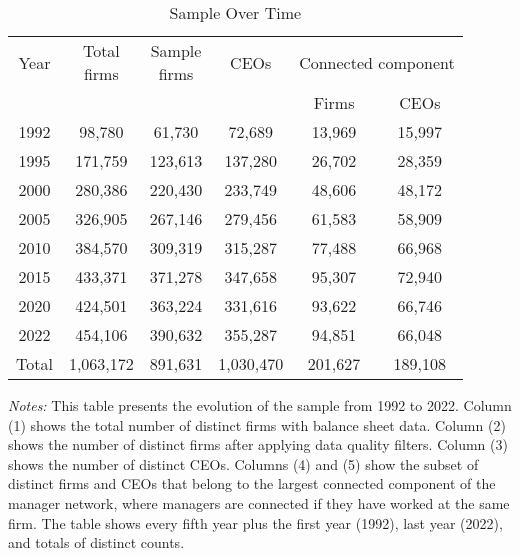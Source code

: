 \begin{table}[htbp]
\centering
\caption{Sample Over Time}
\label{tab:sample}
\begin{tabular}{*{6}{c}}
\toprule
Year & \shortstack{Total\\firms} & \shortstack{Sample\\firms} & CEOs & \multicolumn{2}{c}{Connected component} \\
\cmidrule(lr){5-6}
 & & & & Firms & CEOs \\
\midrule
1992 &       98,780 &       61,730 &       72,689 &       13,969 &       15,997 \\
1995 &      171,759 &      123,613 &      137,280 &       26,702 &       28,359 \\
2000 &      280,386 &      220,430 &      233,749 &       48,606 &       48,172 \\
2005 &      326,905 &      267,146 &      279,456 &       61,583 &       58,909 \\
2010 &      384,570 &      309,319 &      315,287 &       77,488 &       66,968 \\
2015 &      433,371 &      371,278 &      347,658 &       95,307 &       72,940 \\
2020 &      424,501 &      363,224 &      331,616 &       93,622 &       66,746 \\
2022 &      454,106 &      390,632 &      355,287 &       94,851 &       66,048 \\
\midrule
Total &    1,063,172 &      891,631 &    1,030,470 &      201,627 &      189,108 \\
\bottomrule
\end{tabular}
\begin{minipage}{12cm}
\footnotesize
\textit{Notes:} This table presents the evolution of the sample from 1992 to 2022. Column (1) shows the total number of distinct firms with balance sheet data. Column (2) shows the number of distinct firms after applying data quality filters. Column (3) shows the number of distinct CEOs. Columns (4) and (5) show the subset of distinct firms and CEOs that belong to the largest connected component of the manager network, where managers are connected if they have worked at the same firm. The table shows every fifth year plus the first year (1992), last year (2022), and totals of distinct counts. \end{minipage}
\end{table}
